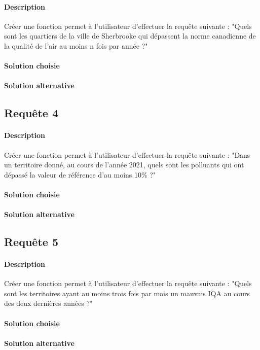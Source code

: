 \documentclass{article}
\begin{document}
\paragraph{Description} Créer une fonction permet à l'utilisateur
d'effectuer la requête suivante : "Quels sont les quartiers de la ville
de Sherbrooke qui dépassent la norme canadienne de la qualité de l'air
au moins n fois par année ?"

\paragraph{Solution choisie}

\paragraph{Solution alternative}

\subsection{Requête 4}
\paragraph{Description} Créer une fonction permet à l'utilisateur
d'effectuer la requête suivante : "Dans un territoire donné, au cours de
l'année 2021, quels sont les polluants qui ont dépassé la valeur de 
référence d'au moins 10\% ?"

\paragraph{Solution choisie}

\paragraph{Solution alternative}

\subsection{Requête 5}
\paragraph{Description} Créer une fonction permet à l'utilisateur
d'effectuer la requête suivante : "Quels sont les territoires ayant au
moins trois fois par mois un mauvais IQA au  cours des deux dernières
années ?"

\paragraph{Solution choisie}

\paragraph{Solution alternative}
\end{document}
